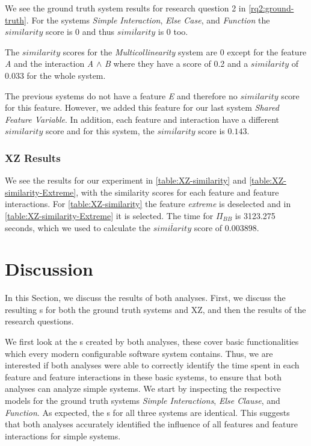 We see the ground truth system results for research question 2 in \autoref{rq2:ground-truth}.  
For the systems \emph{Simple Interaction}, \emph{Else Case}, and \emph{Function} the $similarity$ score is $0$ and thus 
$\overline{similarity}$ is $0$ too. 

The $similarity$ scores for the \emph{Multicollinearity} system are $0$ except for the feature \emph{A} and the interaction
\emph{A} $\land$ \emph{B} where they have a score of 0.2 and a $\overline{similarity}$ of $0.033$
for the whole system.

The previous systems do not have a feature \emph{E} and therefore no $similarity$ score for this feature. 
However, we added this feature for our last system \emph{Shared Feature Variable}. 
In addition, each feature and interaction have a different $similarity$ score and for this system, 
the $\overline{similarity}$ score is $0.143$.

\subsubsection*{XZ Results}

We see the results for our experiment in \autoref{table:XZ-similarity} and \autoref{table:XZ-similarity-Extreme}, with the similarity scores for each feature and feature interactions.
For \autoref{table:XZ-similarity} the feature \emph{extreme} is deselected and in \autoref{table:XZ-similarity-Extreme} it is selected.
The time for $\Pi_{BB}$ is 3123.275 seconds, which we used to calculate the $\overline{similarity}$ score of $0.003898$. 


\section{Discussion}\label{sec:discussion}

In this Section, we discuss the results of both analyses. First, we discuss the resulting {\perfInfluenceModel}s 
for both the ground truth systems and \textsc{XZ}, and then the results of the research questions.

We first look at the {\perfInfluenceModel}s created by both analyses, these cover basic functionalities which every modern 
configurable software system contains. 
Thus, we are interested if both analyses were able to correctly identify the time spent in each feature and feature interactions in these basic systems,
to ensure that both analyses can analyze simple systems.
We start by inspecting the respective models for the ground truth systems \emph{Simple Interactions},
\emph{Else Clause}, and \emph{Function}. As expected, the {\perfInfluenceModel}s for all three systems are identical.
This suggests that both analyses accurately identified the influence of all features and feature interactions for simple systems.

